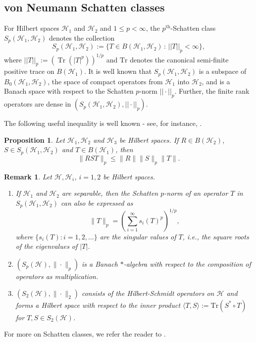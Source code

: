 \documentclass[a4]{amsart}
\theoremstyle{cupthm}
\newtheorem{prop}[thm]{Proposition}
\theoremstyle{cupdefn}
\theoremstyle{cuprem}
\newtheorem{rem}[thm]{Remark}
\numberwithin{equation}{section}
\newcommand{\mH}{\mathcal{H}}
\def\la{\langle}
\def\ra{\rangle}
\begin{document}
\subsection{von Neumann Schatten classes}
For Hilbert spaces $\mathcal H_1$ and $\mathcal H_2$ and $1\leq
p<\infty$, the $p^{\mathrm{th}}$-Schatten class $S_p(\mathcal H_1,\mathcal
H_2)$ denotes the collection
\begin{equation}
  S_p(\mathcal H_1,\mathcal
  H_2):=\{T\in B(\mathcal H_1,\mathcal H_2)\, :\, 
  ||T||_p<\infty\},
\end{equation} where
  $||T||_p:=(\operatorname{Tr}(|T|^p))^{1/p}$ and $\text{Tr}$ denotes
the canonical semi-finite positive trace on $B(\mathcal{H}_1)$. It is
well known that $S_p(\mathcal H_1,\mathcal H_2)$ is a subspace of
$B_0(\mathcal H_1,\mathcal H_2)$, the space of compact operators from
$\mathcal{H}_1$ into $\mathcal{H}_2$, and is a Banach space with
respect to the Schatten $p$-norm $||\cdot||_p$.  Further, the finite rank operators are
dense in $\left(S_p(\mathcal H_1,\mathcal H_2), ||\cdot||_p\right)$.

 The following useful inequality is well known - see, for instance,
\cite[$\S XI.9.7$, Lemma 9(d)]{Dun-Schwartz}.


\begin{prop}\label{Th:2.1}
	Let $\mathcal H_1,\mathcal H_2$ and $\mathcal H_3$ be Hilbert
        spaces. If $R\in B(\mathcal H_2)$, $S\in S_p(\mathcal
        H_1,\mathcal H_2)$ and $T\in B( \mathcal H_1)$,
        then
        \[
        \|RST\|_p\leq \|R\| \|S\|_p \|T\|.
        \]
\end{prop}
\begin{rem}\label{schatten-facts}
  Let $\mH, \mH_i$, $i=1,2$ be Hilbert spaces.
  \begin{enumerate}
\item If $\mathcal{H}_1$ and $\mathcal{H}_2$ are separable, then the
 Schatten $p$-norm of an operator $T$ in $S_p(\mathcal H_1,\mathcal H_2)$ can
  also be expressed as $$\|T\|_p=\left(\sum_{i=1}^\infty
  s_i(T)^p\right)^{1/p},$$ where $\{s_i(T):i=1,2,\dots \}$ are the
  singular values of $T$, i.e., the square roots of the eigenvalues of
  $|T|$.
  \item  $\left(S_p(\mathcal{H}),
    \|\cdot\|_p \right)$ is a Banach $*$-algebra with respect to the
    composition of operators as multiplication.
\item $\left(S_2(\mathcal{H}), \|\cdot\|_2 \right)$ consists of
 the Hilbert-Schmidt operators on $\mathcal{H}$ and forms a Hilbert space with
  respect to the inner product $\la T, S\ra:=\mathrm{Tr}(S^*\circ T)$
  for $T, S \in S_2(\mathcal{H})$.
  \end{enumerate}
\end{rem}
  For more on Schatten classes, we refer the reader to \cite{Palmer, Dun-Schwartz}.
\end{document}
